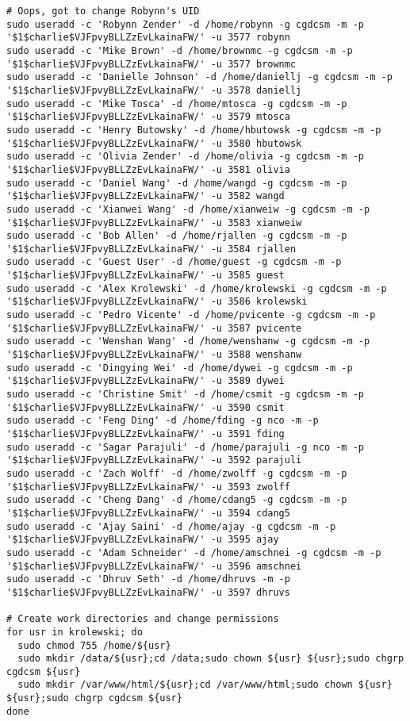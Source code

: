 \documentclass[12pt,twoside]{article}
\begin{document}
\begin{verbatim}
# Oops, got to change Robynn's UID
sudo useradd -c 'Robynn Zender' -d /home/robynn -g cgdcsm -m -p '$1$charlie$VJFpvyBLLZzEvLkainaFW/' -u 3577 robynn
sudo useradd -c 'Mike Brown' -d /home/brownmc -g cgdcsm -m -p '$1$charlie$VJFpvyBLLZzEvLkainaFW/' -u 3577 brownmc
sudo useradd -c 'Danielle Johnson' -d /home/daniellj -g cgdcsm -m -p '$1$charlie$VJFpvyBLLZzEvLkainaFW/' -u 3578 daniellj
sudo useradd -c 'Mike Tosca' -d /home/mtosca -g cgdcsm -m -p '$1$charlie$VJFpvyBLLZzEvLkainaFW/' -u 3579 mtosca
sudo useradd -c 'Henry Butowsky' -d /home/hbutowsk -g cgdcsm -m -p '$1$charlie$VJFpvyBLLZzEvLkainaFW/' -u 3580 hbutowsk
sudo useradd -c 'Olivia Zender' -d /home/olivia -g cgdcsm -m -p '$1$charlie$VJFpvyBLLZzEvLkainaFW/' -u 3581 olivia
sudo useradd -c 'Daniel Wang' -d /home/wangd -g cgdcsm -m -p '$1$charlie$VJFpvyBLLZzEvLkainaFW/' -u 3582 wangd
sudo useradd -c 'Xianwei Wang' -d /home/xianweiw -g cgdcsm -m -p '$1$charlie$VJFpvyBLLZzEvLkainaFW/' -u 3583 xianweiw
sudo useradd -c 'Bob Allen' -d /home/rjallen -g cgdcsm -m -p '$1$charlie$VJFpvyBLLZzEvLkainaFW/' -u 3584 rjallen
sudo useradd -c 'Guest User' -d /home/guest -g cgdcsm -m -p '$1$charlie$VJFpvyBLLZzEvLkainaFW/' -u 3585 guest
sudo useradd -c 'Alex Krolewski' -d /home/krolewski -g cgdcsm -m -p '$1$charlie$VJFpvyBLLZzEvLkainaFW/' -u 3586 krolewski
sudo useradd -c 'Pedro Vicente' -d /home/pvicente -g cgdcsm -m -p '$1$charlie$VJFpvyBLLZzEvLkainaFW/' -u 3587 pvicente
sudo useradd -c 'Wenshan Wang' -d /home/wenshanw -g cgdcsm -m -p '$1$charlie$VJFpvyBLLZzEvLkainaFW/' -u 3588 wenshanw
sudo useradd -c 'Dingying Wei' -d /home/dywei -g cgdcsm -m -p '$1$charlie$VJFpvyBLLZzEvLkainaFW/' -u 3589 dywei
sudo useradd -c 'Christine Smit' -d /home/csmit -g cgdcsm -m -p '$1$charlie$VJFpvyBLLZzEvLkainaFW/' -u 3590 csmit
sudo useradd -c 'Feng Ding' -d /home/fding -g nco -m -p '$1$charlie$VJFpvyBLLZzEvLkainaFW/' -u 3591 fding
sudo useradd -c 'Sagar Parajuli' -d /home/parajuli -g nco -m -p '$1$charlie$VJFpvyBLLZzEvLkainaFW/' -u 3592 parajuli
sudo useradd -c 'Zach Wolff' -d /home/zwolff -g cgdcsm -m -p '$1$charlie$VJFpvyBLLZzEvLkainaFW/' -u 3593 zwolff
sudo useradd -c 'Cheng Dang' -d /home/cdang5 -g cgdcsm -m -p '$1$charlie$VJFpvyBLLZzEvLkainaFW/' -u 3594 cdang5
sudo useradd -c 'Ajay Saini' -d /home/ajay -g cgdcsm -m -p '$1$charlie$VJFpvyBLLZzEvLkainaFW/' -u 3595 ajay
sudo useradd -c 'Adam Schneider' -d /home/amschnei -g cgdcsm -m -p '$1$charlie$VJFpvyBLLZzEvLkainaFW/' -u 3596 amschnei
sudo useradd -c 'Dhruv Seth' -d /home/dhruvs -m -p '$1$charlie$VJFpvyBLLZzEvLkainaFW/' -u 3597 dhruvs

# Create work directories and change permissions 
for usr in krolewski; do
  sudo chmod 755 /home/${usr}
  sudo mkdir /data/${usr};cd /data;sudo chown ${usr} ${usr};sudo chgrp cgdcsm ${usr}
  sudo mkdir /var/www/html/${usr};cd /var/www/html;sudo chown ${usr} ${usr};sudo chgrp cgdcsm ${usr}
done


\end{verbatim}
\end{document}

